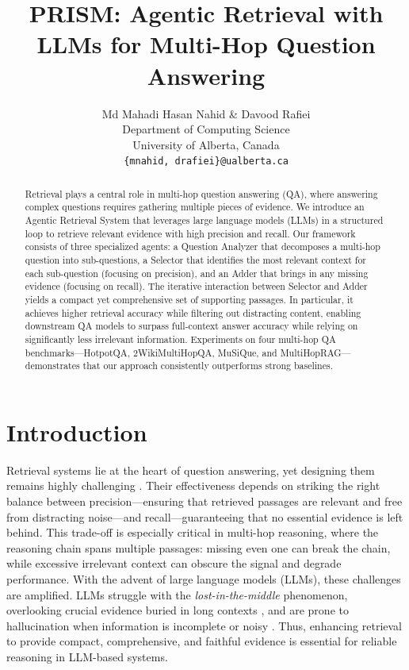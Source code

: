 \documentclass{article} %
\title{PRISM: Agentic Retrieval with LLMs for Multi-Hop Question Answering}
\author{Md Mahadi Hasan Nahid \& Davood Rafiei \\
Department of Computing Science\\
University of Alberta, Canada\\
\texttt{\{mnahid, drafiei\}@ualberta.ca} \\
}
\begin{document}
\maketitle


\begin{abstract}
Retrieval plays a central role in multi-hop question answering (QA), where answering complex questions requires gathering multiple pieces of evidence. We introduce an Agentic Retrieval System that leverages large language models (LLMs) in a structured loop to retrieve relevant evidence with high precision and recall. Our framework consists of three specialized agents: a Question Analyzer that decomposes a multi-hop question into sub-questions, a Selector that identifies the most relevant context for each sub-question (focusing on precision), and an Adder that brings in any missing evidence (focusing on recall). The iterative interaction between Selector and Adder yields a compact yet comprehensive set of supporting passages. In particular, it achieves higher retrieval accuracy while filtering out distracting content, enabling downstream QA models to surpass full-context answer accuracy while relying on significantly less irrelevant information. Experiments on four multi-hop QA benchmarks---HotpotQA, 2WikiMultiHopQA, MuSiQue, and MultiHopRAG---demonstrates that our approach consistently outperforms strong baselines. 

\end{abstract}


\section{Introduction}

Retrieval systems lie at the heart of question answering, yet designing them remains highly challenging \citep{asai2023selfrag}. Their effectiveness depends on striking the right balance between precision---ensuring that retrieved passages are relevant and free from distracting noise---and recall---guaranteeing that no essential evidence is left behind. This trade-off is especially critical in multi-hop reasoning, where the reasoning chain spans multiple passages: missing even one can break the chain, while excessive irrelevant context can obscure the signal and degrade performance. With the advent of large language models (LLMs), these challenges are amplified. LLMs struggle with the \emph{lost-in-the-middle} phenomenon, overlooking crucial evidence buried in long contexts \citep{liu-etal-2024-lost}, and are prone to hallucination when information is incomplete or noisy \citep{laban-etal-2024-summary}. Thus, enhancing retrieval to provide compact, comprehensive, and faithful evidence is essential for reliable reasoning in LLM-based systems.
\end{document}
